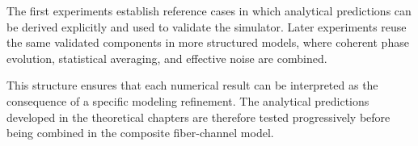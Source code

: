 \medskip

The first experiments establish reference cases in which analytical predictions can be derived explicitly and used to validate the simulator. Later experiments reuse the same validated components in more structured models, where coherent phase evolution, statistical averaging, and effective noise are combined.

\medskip

This structure ensures that each numerical result can be interpreted as the consequence of a specific modeling refinement. The analytical predictions developed in the theoretical chapters are therefore tested progressively before being combined in the composite fiber-channel model.